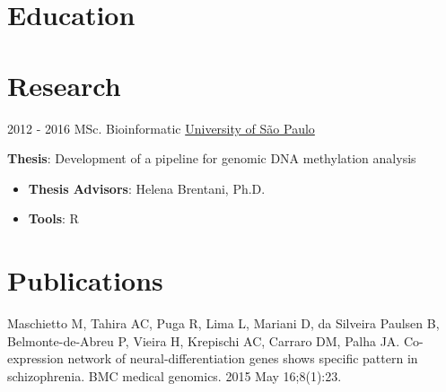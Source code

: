 \documentclass[letterpaper]{twentysecondcv} %
\begin{document}
\makeprofile %

\section{Education}


\section{Research}
\begin{twenty}
	\twentyitem
    	{2012 - 2016}
		{}
        {MSc. Bioinformatic}
        {\href{http://www5.usp.br/}{University of São Paulo}}
        {}
        {
       	\textbf{Thesis}: Development of a pipeline for genomic DNA methylation analysis
        {\begin{itemize}
        \item \textbf{Thesis Advisors}: Helena Brentani, Ph.D.
        \item \textbf{Tools}: R \vspace{2mm}
		\end{itemize}}
        }
\end{twenty}

\section{Publications}

Maschietto M, Tahira AC, Puga R, Lima L, Mariani D, da Silveira Paulsen B, Belmonte-de-Abreu P, Vieira H, Krepischi AC, Carraro DM, Palha JA. Co-expression network of neural-differentiation genes shows specific pattern in schizophrenia. BMC medical genomics. 2015 May 16;8(1):23. \vspace{2mm}
\end{document}
